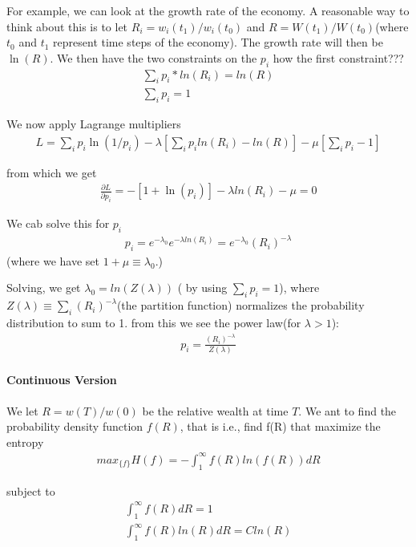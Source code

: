 \documentclass[10 pt,final]{article}
\newcommand{\impo}[1]{{\color{magenta} #1}}
\newcommand{\question}[1]{{\color{blue} #1}}
\begin{document}
For example, we can look at the growth rate of the economy. A reasonable way to think about this is to let $R_i = w_i(t_1)/w_i(t_0)$ and $R=W(t_1)/W(t_0)$(where $t_0$ and $t_1$ represent time steps of the economy). The growth rate will then be $\ln(R)$. We then have the \impo{two constraints} on the $p_i$ \question{how the first constraint???}
\begin{align*}
\sum_i p_i *ln(R_i) = ln(R) \\
\sum_i p_i =1
\end{align*}

We now apply \impo{Lagrange multipliers}
\begin{align*}
L = \sum_i p_i \ln(1/p_i) - \lambda[\sum_i p_iln(R_i) - ln(R)] - \mu[\sum_i p_i -1]
\end{align*}

from which we get
\begin{align*}
\frac{\partial L}{\partial p_i} = -[1+\ln(p_i)] - \lambda ln(R_i) - \mu = 0
\end{align*}

We cab solve this for $p_i$
\begin{align*}
p_i = e^{-\lambda_0} e^{-\lambda ln(R_i)} = e^{-\lambda_0} (R_i)^{-\lambda}
\end{align*}
(where we have set $1+\mu \equiv \lambda_0$.)

Solving, we get $\lambda_0 = ln(Z(\lambda))$ (\impo{by using $\sum_i p_i =1$}), where $Z(\lambda) \equiv \sum_i (R_i)^{-\lambda}$(the partition function) normalizes the probability distribution to sum to 1. from this we see the power law(for $\lambda >1$):
\begin{align*}
p_i = \frac{(R_i)^{-\lambda}}{Z(\lambda)}
\end{align*}

\paragraph{Continuous Version} We let $R= w(T)/w(0)$ be the relative wealth at time $T$. We ant to find the probability density function $f(R)$, that is \impo{i.e., find f(R) that maximize the entropy}
\begin{align*}
max_{\{f\}} H(f) = - \int_1^\infty f(R) ln(f(R)) dR
\end{align*}

subject to
\begin{align*}
\int_1^\infty f(R)dR = 1 \\
\int_1^\infty f(R) ln(R) dR = Cln(R)
\end{align*}
\end{document}
